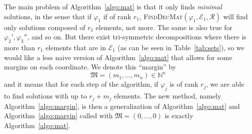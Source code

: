 \documentclass[a4paper,11pt]{article}
\begin{document}
The main problem of Algorithm~\ref{algo:mat} is that it only finds
\emph{minimal} solutions, in the sense that if $\varphi_1$ if of rank $r_1$,
\textsc{FindDecMat}$(\varphi_1, \mathcal E_1, \mathcal R)$ will find only
solutions composed of $r_1$ elements, not more. The same is also true for
$\varphi_2', \varphi_3''$, and so on. But there exist tri-symmetric
decompositions where there is more than $r_1$ elements that are in $\mathcal
E_1$ (as can be seen in Table~\ref{tab:sets}), so we would like a less naive version of Algorithm~\ref{algo:mat} that
allows for some margins on each coordinate. We denote this ``margin'' by
\[
  \mathfrak M = (m_1, \dots, m_n)\in \mathbb{N}^n
\]
and it means that for each step of the algorithm, if $\varphi_j$ is of rank
$r_j$, we are able to find solutions with up to $r_j + m_j$ elements. The new
method, namely Algorithm~\ref{algo:margin}, is then a generalization of
Algorithm~\ref{algo:mat} and Algorithm~\ref{algo:margin} called with $\mathfrak
M=(0, \dots, 0)$ is exactly Algorithm~\ref{algo:mat}.
\end{document}
